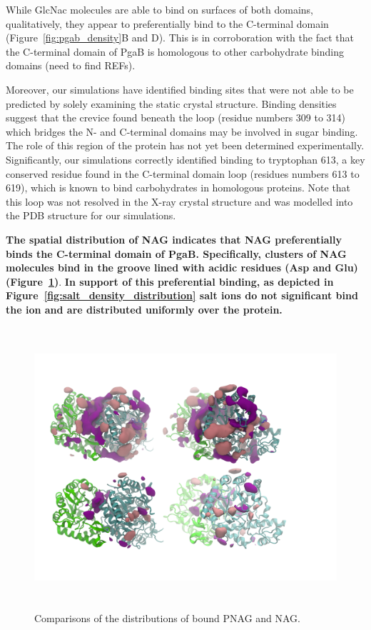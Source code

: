 While GlcNac molecules are able to bind on surfaces of both domains, qualitatively, they appear to preferentially bind to the C-terminal domain (Figure~\ref{fig:pgab_density}B and D). This is in corroboration with the fact that the C-terminal domain of PgaB is homologous to other carbohydrate binding domains (need to find REFs).

Moreover, our simulations have identified binding sites that were not able to be predicted by solely examining the static crystal structure. Binding densities suggest that the crevice found beneath the loop (residue numbers 309 to 314) which bridges the N- and C-terminal domains may be involved in sugar binding. The role of this region of the protein has not yet been determined experimentally. Significantly, our simulations correctly identified binding to tryptophan 613, a key conserved residue found in the C-terminal domain loop (residues numbers 613 to 619), which is known to bind carbohydrates in homologous proteins. Note that this loop was not resolved in the X-ray crystal structure and was modelled into the PDB structure for our simulations.

\textbf{The spatial distribution of NAG indicates that NAG preferentially binds the C-terminal domain of PgaB. Specifically, clusters of NAG molecules bind in the groove lined with acidic residues (Asp and Glu) (Figure~\ref{fig:pnag_nag_overlapped_zoomedout})}.  \textbf{In support of this preferential binding,  as depicted in Figure~\ref{fig:salt_density_distribution} salt ions do not significant bind the ion and are distributed uniformly over the protein.}

\begin{figure}
\centering
\includegraphics[height=4.1in, width=6.23in]{figures/results4/pnag_nag_sdf_zoomedout.png}
\caption{Comparisons of the distributions of bound PNAG and NAG.}
\label{fig:pnag_nag_overlapped_zoomedout}
\end{figure}

